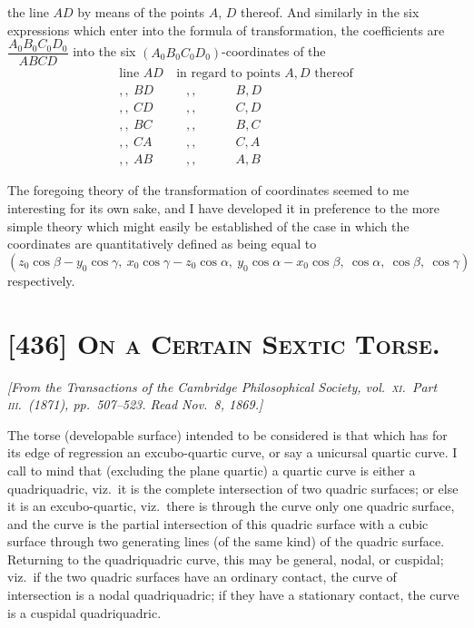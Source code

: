 \documentclass[11pt,a4paper]{article}
\begin{document}
the line $AD$ by means of the points $A$, $D$ thereof. And similarly in the six
expressions which enter into the formula of transformation, the coefficients are
$\dfrac{A_0 B_0 C_0 D_0}{ABCD}$ into the six $(A_0 B_0 C_0 D_0)$-coordinates of the
\begin{align*}
\text{line } AD &\ \text{in regard to points } A, D \text{ thereof} \\
,, \ BD &\quad ,, \quad\quad\quad B, D \\
,, \ CD &\quad ,, \quad\quad\quad C, D \\
,, \ BC &\quad ,, \quad\quad\quad B, C \\
,, \ CA &\quad ,, \quad\quad\quad C, A \\
,, \ AB &\quad ,, \quad\quad\quad A, B
\end{align*}

The foregoing theory of the transformation of coordinates seemed to me interesting
for its own sake, and I have developed it in preference to the more simple theory
which might easily be established of the case in which the coordinates are
quantitatively defined as being equal to
\[
(z_0 \cos\beta - y_0 \cos\gamma,\ x_0 \cos\gamma - z_0 \cos\alpha,\
 y_0 \cos\alpha - x_0 \cos\beta,\ \cos\alpha,\ \cos\beta,\ \cos\gamma)
\]
respectively.

\clearpage

\section{[436] \textsc{On a Certain Sextic Torse.}}

\begin{center}
\textit{[From the Transactions of the Cambridge Philosophical Society, vol.\ \textsc{xi}.\ Part \textsc{iii}.\ (1871), pp.\ 507--523. Read Nov.\ 8, 1869.]}
\end{center}

\medskip

The torse (developable surface) intended to be considered is that which has for its
edge of regression an excubo-quartic curve, or say a unicursal quartic curve. I call
to mind that (excluding the plane quartic) a quartic curve is either a quadriquadric,
viz.\ it is the complete intersection of two quadric surfaces; or else it is an
excubo-quartic, viz.\ there is through the curve only one quadric surface, and the curve
is the partial intersection of this quadric surface with a cubic surface through two
generating lines (of the same kind) of the quadric surface. Returning to the
quadriquadric curve, this may be general, nodal, or cuspidal; viz.\ if the two quadric
surfaces have an ordinary contact, the curve of intersection is a nodal quadriquadric;
if they have a stationary contact, the curve is a cuspidal quadriquadric.
\end{document}
